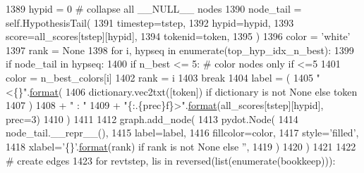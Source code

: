 \begin{DoxyCode}
1389                     hypid = 0  \textcolor{comment}{# collapse all \_\_NULL\_\_ nodes}
1390                 node\_tail = self.HypothesisTail(
1391                     timestep=tstep,
1392                     hypid=hypid,
1393                     score=all\_scores[tstep][hypid],
1394                     tokenid=token,
1395                 )
1396                 color = \textcolor{stringliteral}{'white'}
1397                 rank = \textcolor{keywordtype}{None}
1398                 \textcolor{keywordflow}{for} i, hypseq \textcolor{keywordflow}{in} enumerate(top\_hyp\_idx\_n\_best):
1399                     \textcolor{keywordflow}{if} node\_tail \textcolor{keywordflow}{in} hypseq:
1400                         \textcolor{keywordflow}{if} n\_best <= 5:  \textcolor{comment}{# color nodes only if <=5}
1401                             color = n\_best\_colors[i]
1402                         rank = i
1403                         \textcolor{keywordflow}{break}
1404                 label = (
1405                     \textcolor{stringliteral}{"<\{\}"}.\hyperlink{namespaceparlai_1_1chat__service_1_1services_1_1messenger_1_1shared__utils_a32e2e2022b824fbaf80c747160b52a76}{format}(
1406                         dictionary.vec2txt([token]) \textcolor{keywordflow}{if} dictionary \textcolor{keywordflow}{is} \textcolor{keywordflow}{not} \textcolor{keywordtype}{None} \textcolor{keywordflow}{else} token
1407                     )
1408                     + \textcolor{stringliteral}{" : "}
1409                     + \textcolor{stringliteral}{"\{:.\{prec\}f\}>"}.\hyperlink{namespaceparlai_1_1chat__service_1_1services_1_1messenger_1_1shared__utils_a32e2e2022b824fbaf80c747160b52a76}{format}(all\_scores[tstep][hypid], prec=3)
1410                 )
1411 
1412                 graph.add\_node(
1413                     pydot.Node(
1414                         node\_tail.\_\_repr\_\_(),
1415                         label=label,
1416                         fillcolor=color,
1417                         style=\textcolor{stringliteral}{'filled'},
1418                         xlabel=\textcolor{stringliteral}{'\{\}'}.\hyperlink{namespaceparlai_1_1chat__service_1_1services_1_1messenger_1_1shared__utils_a32e2e2022b824fbaf80c747160b52a76}{format}(rank) \textcolor{keywordflow}{if} rank \textcolor{keywordflow}{is} \textcolor{keywordflow}{not} \textcolor{keywordtype}{None} \textcolor{keywordflow}{else} \textcolor{stringliteral}{''},
1419                     )
1420                 )
1421 
1422         \textcolor{comment}{# create edges}
1423         \textcolor{keywordflow}{for} revtstep, lis \textcolor{keywordflow}{in} reversed(list(enumerate(bookkeep))):

\end{DoxyCode}
